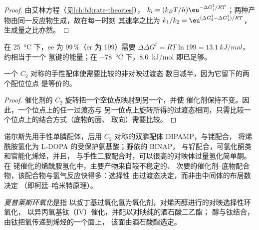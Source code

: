 \begin{proof}
由艾林方程（见\cref{ch:b3:rate-theories}），
$k_i = (k_BT/h)\eu^{-\Delta G_i^\ddagger/RT}$；两种产物由同一反应物生成，故在每一时刻
其速率之比为 $k_1/k_2 = \eu^{(\Delta G_2^\ddagger - \Delta G_1^\ddagger)/RT}$，生成量之比亦然。
\end{proof}

在 \qty{25}{\celsius} 下，ee 为 99\,\%（er 为 199）需要 $\Delta\Delta G^\ddagger = RT\ln 199 = \qty{13.1}{kJ/mol}$，约相当于一个
氢键的能量；在 \qty{-78}{\celsius} 下，\qty{8.6}{kJ/mol} 即已足够。

\begin{proposition}[$C_2$ 对称配体]\label{prop:b3:asymmetric-synthesis:c2}
一个 $C_2$ 对称的手性配体使需要比较的非对映过渡态
数目减半，因为它留下的两个配位位点
是等价的。
\end{proposition}

\begin{proof}
催化剂的 $C_2$ 旋转把一个空位点映射到另一个，并使
催化剂保持不变。因此，一个位点上的任一过渡态与
另一位点上旋转所得的过渡态相同，只需比较一个位点上的结合方式（底物的面、
取向）需要比较。
\end{proof}

诺尔斯先用手性单膦配体，后用 $C_2$ 对称的双膦配体 DIPAMP，与铑配合，
将烯酰胺氢化为 L-DOPA 的受保护氨基酸；野依的 BINAP，
与钌配合，可氢化酮类和官能化烯烃，并且，
与手性二胺配合时，可以很高的对映体过量氢化简单酮。在
铑催化的烯酰胺氢化中，主要产物来自较不稳定的、
次要的催化剂–底物配合物，该配合物与氢气反应快得多：选择性
由过渡态决定，而非由中间体的布居数决定
（即柯廷–哈米特原理）。

\begin{definition}[夏普莱斯环氧化]\label{def:b3:asymmetric-synthesis:sharpless}
\emph{夏普莱斯环氧化}是指
以叔丁基过氧化氢为氧化剂，对烯丙醇进行的对映选择性环氧化，
以异丙氧基钛（IV）催化，并配以对映纯的酒石酸二乙酯；
醇与钛结合，由钛把氧传递到烯烃的一个面上，
该面由酒石酸酯选定。
\end{definition}

